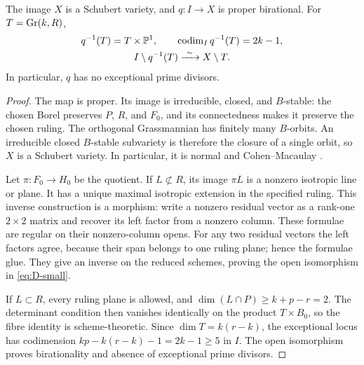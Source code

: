 \begin{lemma}\label{D:image}
The image $X$ is a Schubert variety, and $q:I\to X$ is proper birational. For $T=\operatorname{Gr}(k,R)$,
\begin{equation}\label{eq:D-small}
 \begin{gathered}
 q^{-1}(T)=T\times\mathbb P^1,\qquad\operatorname{codim}_Iq^{-1}(T)=2k-1,\\
 I\setminus q^{-1}(T)\xrightarrow{\ \sim\ }X\setminus T.
 \end{gathered}
\end{equation}
In particular, $q$ has no exceptional prime divisors.
\end{lemma}
\begin{proof}
The map is proper. Its image is irreducible, closed, and $B$-stable: the chosen Borel preserves $P$, $R$, and $F_0$, and its connectedness makes it preserve the chosen ruling. The orthogonal Grassmannian has finitely many $B$-orbits. An irreducible closed $B$-stable subvariety is therefore the closure of a single orbit, so $X$ is a Schubert variety. In particular, it is normal and Cohen--Macaulay \cite{Ram85,Bri05}.

Let $\pi:F_0\to H_0$ be the quotient. If $L\not\subset R$, its image $\pi L$ is a nonzero isotropic line or plane. It has a unique maximal isotropic extension in the specified ruling. This inverse construction is a morphism: write a nonzero residual vector as a rank-one $2\times2$ matrix and recover its left factor from a nonzero column. These formulae are regular on their nonzero-column opens. For any two residual vectors the left factors agree, because their span belongs to one ruling plane; hence the formulae glue. They give an inverse on the reduced schemes, proving the open isomorphism in \eqref{eq:D-small}.

If $L\subset R$, every ruling plane is allowed, and $\dim(L\cap P)\ge k+p-r=2$. The determinant condition then vanishes identically on the product $T\times B_0$, so the fibre identity is scheme-theoretic. Since $\dim T=k(r-k)$, the exceptional locus has codimension $kp-k(r-k)-1=2k-1\ge5$ in $I$. The open isomorphism proves birationality and absence of exceptional prime divisors.
\end{proof}

